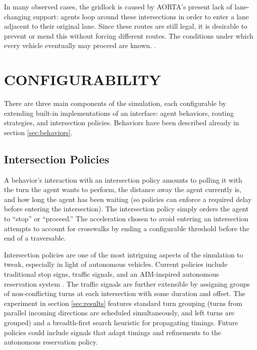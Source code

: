 \documentclass[letterpaper, 10 pt, conference]{ieeeconf}  %
\begin{document}
In many observed cases, the gridlock is caused by AORTA's present lack of
lane-changing support: agents loop around these intersections in order to enter
a lane adjacent to their original lane. Since these routes are still legal, it
is desirable to prevent or mend this without forcing different routes. The
conditions under which every vehicle eventually may proceed are known.
\cite{AAAI11-au}.


\section{CONFIGURABILITY}
\label{sec:config}

There are three main components of the simulation, each configurable by
extending built-in implementations of an interface: agent behaviors, routing
strategies, and intersection policies. Behaviors have been described already in
section \ref{sec:behaviors}.

\subsection{Intersection Policies}

A behavior's interaction with an intersection policy amounts to polling it with
the turn the agent wants to perform, the distance away the agent currently is,
and how long the agent has been waiting (so policies can enforce a required
delay before entering the intersection). The intersection policy simply orders
the agent to ``stop'' or ``proceed.'' The acceleration chosen to avoid entering
an intersection attempts to account for crosswalks by ending a configurable
threshold before the end of a traversable.

Intersection policies are one of the most intriguing aspects of the simulation
to tweak, especially in light of autonomous vehicles. Current policies include
traditional stop signs, traffic signals, and an AIM-inspired autonomous
reservation system \cite{JAIR08-dresner}. The traffic signals are further
extensible by assigning groups of non-conflicting turns at each intersection
with some duration and offset. The experiment in section \ref{sec:results}
features standard turn grouping (turns from parallel incoming directions are
scheduled simultaneously, and left turns are grouped) and a breadth-first search
heuristic for propagating timings. Future policies could include signals that
adapt timings and refinements to the autonomous reservation policy.
\end{document}
